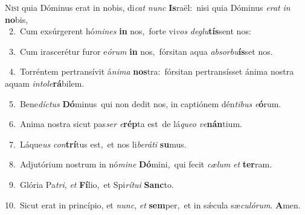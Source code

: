 \lettrine{\initial\textcolor{\initialcolor}{N}}{isi} quia Dóminus erat in nobis, di\textit{cat} \textit{nunc} \textbf{Is}\-raël:~\star nisi quia Dóminus \textit{e}\-\textit{rat} \textit{in} \textbf{no}\-bis,\\
{\numbfont\textcolor{\numbcolor}{~2.}}~Cum exsúrgerent hó\-\textit{mi}\-\textit{nes} \textbf{in} nos,~\star forte vi\textit{vos} \textit{de}\-\textit{glu}\textbf{tís}sent nos:\par
{\numbfont\textcolor{\numbcolor}{~3.}}~Cum irascerétur furor e\-\textit{ó}\-\textit{rum} \textbf{in} nos,~\star fórsitan aqua \textit{ab}\-\textit{sor}\textit{bu}\textbf{ís}set nos.\par
{\numbfont\textcolor{\numbcolor}{~4.}}~Torréntem pertransívit á\-\textit{ni}\-\textit{ma} \textbf{nos}\-tra:~\star fórsitan pertransísset ánima nostra aquam \textit{in}\-\textit{to}\textit{le}\textbf{rá}bilem.\par
{\numbfont\textcolor{\numbcolor}{~5.}}~Bene\-\textit{díc}\-\textit{tus} \textbf{Dó}\-minus~\star qui non dedit nos, in captiónem dén\-\textit{ti}\-\textit{bus} \textit{e}\-\textbf{ó}rum.\par
{\numbfont\textcolor{\numbcolor}{~6.}}~Anima nostra sicut pas\textit{ser} \textit{e}\-\textbf{rép}ta est~\star de lá\-\textit{que}\-\textit{o} \textit{ve}\-\textbf{nán}tium.\par
{\numbfont\textcolor{\numbcolor}{~7.}}~Láque\textit{us} \textit{con}\-\textbf{trí}tus est,~\star et nos li\-\textit{be}\-\textit{rá}\textit{ti} \textbf{su}\-mus.\par
{\numbfont\textcolor{\numbcolor}{~8.}}~Adjutórium nostrum in nó\-\textit{mi}\-\textit{ne} \textbf{Dó}\-mini,~\star qui fecit \textit{cæ}\-\textit{lum} \textit{et} \textbf{ter}\-ram.\par
{\numbfont\textcolor{\numbcolor}{~9.}}~Glória Pa\-\textit{tri}\-, \textit{et} \textbf{Fí}\-lio,~\star et Spi\-\textit{rí}\-\textit{tu}\textit{i} \textbf{Sanc}\-to.\par
{\numbfont\textcolor{\numbcolor}{10.}}~Sicut erat in princípio, et \textit{nunc}\-, \textit{et} \textbf{sem}\-per,~\star et in sǽcula sæ\-\textit{cu}\-\textit{ló}\textit{rum}. \textbf{A}\-men.\par
